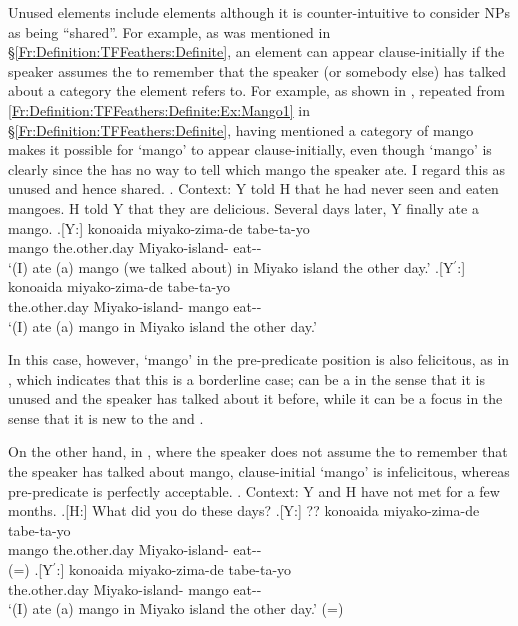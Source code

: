 Unused elements include  elements
although it is counter-intuitive to consider  NPs as being ``shared''.
For example, as was mentioned in \S \ref{Fr:Definition:TFFeathers:Definite},
an  element can appear clause-initially
if the speaker assumes the  to remember that the speaker (or somebody else) has talked about a category the element refers to.
For example, as shown in \Next[Y],
repeated from \ref{Fr:Definition:TFFeathers:Definite:Ex:Mango1} in \S \ref{Fr:Definition:TFFeathers:Definite},
having mentioned a category of mango makes it possible for  `mango' to appear clause-initially,
even though
 `mango' is clearly 
since the  has no way to tell which mango the speaker ate.
I regard this as unused and hence shared.
%
\ex. Context:
	Y told H that he had never seen and eaten mangoes.
	H told Y that they are delicious.
	Several days later, Y finally ate a mango.
	\ag.[Y:]  konoaida miyako-zima-de tabe-ta-yo \\
			mango the.other.day Miyako-island- eat-- \\
			`(I) ate (a) mango (we talked about) in Miyako island the other day.'
	\bg.[Y$^{\prime}$:] konoaida miyako-zima-de  tabe-ta-yo \\
			the.other.day Miyako-island- mango eat-- \\
			`(I) ate (a) mango in Miyako island the other day.'

In this case, however,
 `mango' in the pre-predicate position is also felicitous,
as in \Last[Y$^{\prime}$],
which indicates that this is a borderline case;
 can be a  in the sense that
it is unused and the speaker has talked about it before,
while it can be a focus in the sense that
it is new to the  and .

On the other hand, in \Next[Y],
where the speaker does not assume the  to remember that
the speaker has talked about mango,
clause-initial  `mango' is infelicitous,
whereas pre-predicate  is perfectly acceptable.
%
\ex. Context:
	Y and H have not met for a few months.
	\a.[H:] What did you do these days?
	\bg.[Y:] ?? konoaida miyako-zima-de tabe-ta-yo \\
			mango the.other.day Miyako-island- eat-- \\
		\hfill(=\LLast[Y])
	\bg.[Y$^{\prime}$:] konoaida miyako-zima-de  tabe-ta-yo \\
			the.other.day Miyako-island- mango eat-- \\
			`(I) ate (a) mango in Miyako island the other day.'
		\hfill(=\LLast[Y$^{\prime}$])

